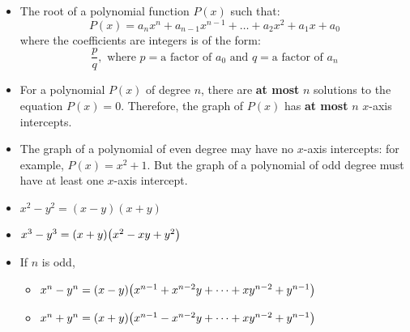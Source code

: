 \documentclass[12pt,a4paper,titlepage]{article}
\DeclarePairedDelimiter {\pars}  {  (      }     {  )      }
\begin{document}
            \begin{SummaryBox}[title=Rational root theorem]
                \begin{itemize}[leftmargin=*]
                    \item The root of a polynomial function $P(x)$ such that:
                    \[
                        P(x) = a_nx^n + a_{n-1}x^{n-1} + \dots + a_2x^2 + a_1x + a_0
                    \]
                    where the coefficients are integers is of the form:
                    \[
                        \frac{p}{q},\text{ where }p = \text{a factor of }a_0\text{ and }q = \text{a factor of }a_n
                    \]
                \end{itemize}
            \end{SummaryBox}
            
            \begin{SummaryBox}[title=Polynomials of degree \texorpdfstring{$\bm{n}$}{$n$}, list text={Polynomials of degree $n$}]
                \begin{itemize}[leftmargin=*]
                    \item For a polynomial $P(x)$ of degree $n$, there are \textbf{at most} $n$ solutions to the equation $P(x)=0$. Therefore, the graph of $P(x)$ has \textbf{at most} $n$ $x$-axis intercepts.
                    \item The graph of a polynomial of even degree may have no $x$-axis intercepts: for example, $P(x) = x^2 + 1$. But the graph of a polynomial of odd degree must have at least one $x$-axis intercept.
                \end{itemize}
            \end{SummaryBox}
            
            \begin{SummaryBox}[title=Difference and sum of two variables of the same degree]
                \begin{itemize}[leftmargin=*]
                    \item $x^2 - y^2 = (x-y)(x+y)$
                    \item $x^3 - y^3 = (x+y)\pars*{x^2 - xy + y^2}$
                    \item If $n$ is odd,
                    \begin{itemize}[topsep=0pt]
                        \item $x^n - y^n = (x-y)\pars*{x^{n-1} + x^{n-2}y + \dots + xy^{n-2} + y^{n-1}}$
                        \item $x^n + y^n = (x+y)\pars*{x^{n-1} - x^{n-2}y + \dots + xy^{n-2} + y^{n-1}}$
                    \end{itemize}
                \end{itemize}
            \end{SummaryBox}
            
\end{document}

